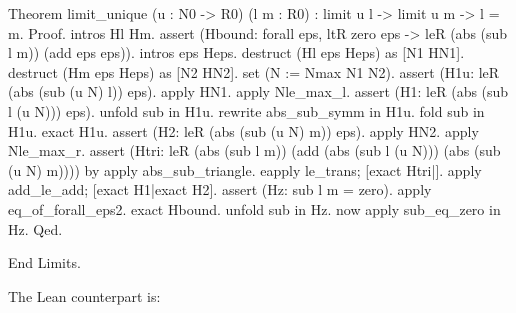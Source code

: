 \documentclass{article}
\theoremstyle{plain}
\theoremstyle{definition}
\theoremstyle{remark}
\begin{document}
\begin{rocq}
		Theorem limit_unique (u : N0 -> R0) (l m : R0) :
		limit u l -> limit u m -> l = m.
		Proof.
		intros Hl Hm.
		assert (Hbound: forall eps, ltR zero eps -> leR (abs (sub l m))
		(add eps eps)).
		{ intros eps Heps.
			destruct (Hl eps Heps) as [N1 HN1].
			destruct (Hm eps Heps) as [N2 HN2].
			set (N := Nmax N1 N2).
			assert (H1u: leR (abs (sub (u N) l)) eps).
			{ apply HN1. apply Nle_max_l. }
			assert (H1: leR (abs (sub l (u N))) eps).
			{ unfold sub in H1u. rewrite abs_sub_symm in H1u. fold sub
				in H1u. exact H1u. }
			assert (H2: leR (abs (sub (u N) m)) eps).
			{ apply HN2. apply Nle_max_r. }
			assert (Htri: leR (abs (sub l m)) (add (abs (sub l (u N)))
			(abs (sub (u N) m)))) by apply abs_sub_triangle.
			eapply le_trans; [exact Htri|].
			apply add_le_add; [exact H1|exact H2].
		}
		assert (Hz: sub l m = zero).
		{ apply eq_of_forall_eps2. exact Hbound. }
		unfold sub in Hz.
		now apply sub_eq_zero in Hz.
		Qed.
		
		End Limits.
	\end{rocq}
	
	The Lean counterpart is:
	
\end{document}
